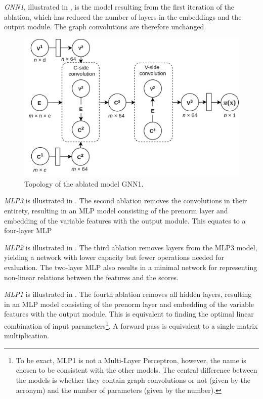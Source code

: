 \textit{GNN1}, illustrated in , is the model resulting from the first iteration of the ablation, which has reduced the number of layers in the embeddings and the output module. The graph convolutions are therefore unchanged.

\begin{figure}
    \centering
    \includegraphics[width=\linewidth]{img/gnn_1.png}
    \caption{Topology of the ablated model GNN1.}
    \label{fig:gnn1}
\end{figure}

\textit{\gls{MLP}3} is illustrated in . The second ablation removes the convolutions in their entirety, resulting in an \gls{MLP} model consisting of the prenorm layer and embedding of the variable features with the output module. This equates to a four-layer \gls{MLP}


\textit{\gls{MLP}2} is illustrated in . The third ablation removes layers from the MLP3 model, yielding a network with lower capacity but fewer operations needed for evaluation. The two-layer \gls{MLP} also results in a minimal network for representing non-linear relations between the features and the scores. 


\textit{\gls{MLP}1} is illustrated in . The fourth ablation removes all hidden layers, resulting in an \gls{MLP} model consisting of the prenorm layer and embedding of the variable features with the output module. This is equivalent to finding the optimal linear combination of input parameters\footnote{To be exact, MLP1 is not a Multi-Layer Perceptron, however, the name is chosen to be consistent with the other models. The central difference between the models is whether they contain graph convolutions or not (given by the acronym) and the number of parameters (given by the number).}. A forward pass is equivalent to a single matrix multiplication. 


